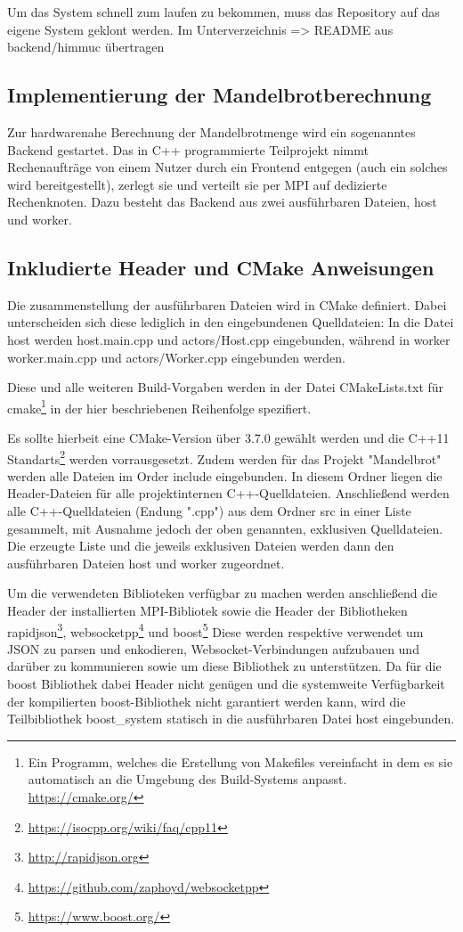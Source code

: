 Um das System schnell zum laufen zu bekommen, muss das Repository auf das eigene System geklont werden.
Im Unterverzeichnis
=> README aus backend/himmuc übertragen

\subsection{Implementierung der Mandelbrotberechnung}

Zur hardwarenahe Berechnung der Mandelbrotmenge wird ein sogenanntes Backend gestartet.
Das in C++ programmierte Teilprojekt nimmt Rechenaufträge von einem Nutzer durch ein Frontend entgegen (auch
ein solches wird bereitgestellt), zerlegt sie und verteilt sie per MPI auf dedizierte Rechenknoten.
Dazu besteht das Backend aus zwei ausführbaren Dateien, host und worker. %

\subsection{Inkludierte Header und CMake Anweisungen}

Die zusammenstellung der ausführbaren Dateien wird in CMake definiert.
Dabei unterscheiden sich diese lediglich in den eingebundenen Quelldateien:
In die Datei host werden host.main.cpp und actors/Host.cpp eingebunden, während
in worker worker.main.cpp und actors/Worker.cpp eingebunden werden.

Diese und alle weiteren Build-Vorgaben werden in der Datei CMakeLists.txt für 
cmake\footnote{Ein Programm, welches die Erstellung von Makefiles vereinfacht in dem es sie automatisch an die Umgebung des Build-Systems anpasst. \url{https://cmake.org/}}
in der hier beschriebenen Reihenfolge spezifiert.

Es sollte hierbeit eine CMake-Version über 3.7.0 gewählt werden und die C++11 Standarts\footnote{\url{https://isocpp.org/wiki/faq/cpp11}} werden vorrausgesetzt.
Zudem werden für das Projekt "Mandelbrot" werden alle Dateien im Order include eingebunden.
In diesem Ordner liegen die Header-Dateien für alle projektinternen C++-Quelldateien.
Anschließend werden alle C++-Quelldateien (Endung ".cpp") aus dem Ordner src in einer Liste gesammelt, mit Ausnahme jedoch der oben genannten, exklusiven Quelldateien.
Die erzeugte Liste und die jeweils exklusiven Dateien werden dann den ausführbaren Dateien host und worker zugeordnet.

Um die verwendeten Biblioteken verfügbar zu machen werden anschließend die Header der installierten MPI-Bibliotek
sowie die Header der Bibliotheken rapidjson\footnote{\url{http://rapidjson.org}}, websocketpp\footnote{\url{https://github.com/zaphoyd/websocketpp}} und boost\footnote{\url{https://www.boost.org/}}
Diese werden respektive verwendet um JSON zu parsen und enkodieren, Websocket-Verbindungen aufzubauen und darüber zu kommunieren sowie um diese Bibliothek zu unterstützen.
Da für die boost Bibliothek dabei Header nicht genügen und die systemweite Verfügbarkeit der kompilierten boost-Bibliothek nicht garantiert werden kann, wird die Teilbibliothek boost\_system statisch
in die ausführbaren Datei host eingebunden.

